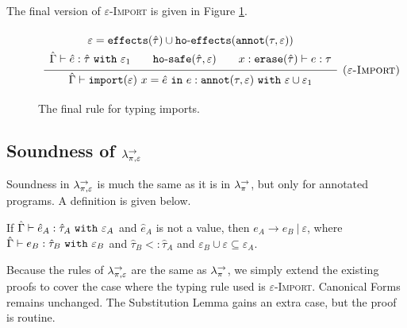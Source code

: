 The final version of \textsc{$\varepsilon$-Import} is given in Figure \ref{fig:import_rule}.

\begin{figure}[h]

\noindent
{}

\[
\begin{array}{c}

\infer[\textsc{($\varepsilon$-Import)}]
	{ \hat \Gamma \vdash \kwa{import}(\varepsilon)~x = \hat e~\kw{in} e: \kwa{annot}(\tau, \varepsilon)~\kw{with} \varepsilon \cup \varepsilon_1 }
{{\def\arraystretch{1.4}
  \begin{array}{c}
\varepsilon = \kwa{effects}(\hat \tau) \cup \hofx{\annot{\tau}{\varepsilon}} \\
\hat \Gamma \vdash \hat e: \hat \tau~\kw{with} \varepsilon_1 ~~~~~~ \kwa{ho \hyphen safe}(\hat \tau, \varepsilon) ~~~~~~ x: \kwa{erase}(\hat \tau) \vdash e: \tau
  \end{array}}} 
 
\end{array}
\]


\vspace{-7pt}
\caption{The final rule for typing imports.}
\label{fig:import_rule}
\end{figure}




\subsection{Soundness of $\lambda^{\rightarrow}_{\pi, \varepsilon}$}

Soundness in $\lambda^{\rightarrow}_{\pi, \varepsilon}$ is much the same as it is in $\lambda^{\rightarrow}_{\pi}$, but only for annotated programs. A definition is given below.

\begin{theorem}[Soundness]
If $\hat \Gamma \vdash \hat e_A: \hat \tau_A~\mathtt{with}~ \varepsilon_A$ and $\hat e_A$ is not a value, then $e_A \longrightarrow e_B~|~\varepsilon$, where $\hat \Gamma \vdash e_B: \hat \tau_B~\mathtt{with}~ \varepsilon_B$ and $\hat \tau_B <: \hat \tau_A$ and $\varepsilon_B \cup \varepsilon \subseteq \varepsilon_A$.
\end{theorem}

Because the rules of $\lambda^{\rightarrow}_{\pi, \varepsilon}$ are the same as $\lambda^{\rightarrow}_{\pi}$, we simply extend the existing proofs to cover the case where the typing rule used is \textsc{$\varepsilon$-Import}. Canonical Forms remains unchanged. The Substitution Lemma gains an extra case, but the proof is routine.

